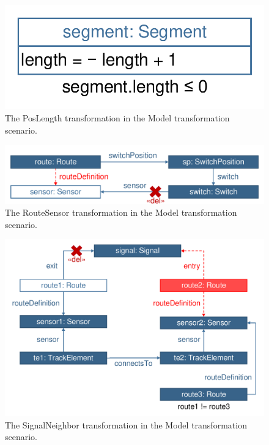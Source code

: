 \begin{figure}[!Htb]
	\centering
	\includegraphics[scale=0.4]{figures/trainbenchmark-transformation-xform-poslength}
	\caption{The \textsf{PosLength} transformation in the Model transformation scenario.}
	\label{fig:trainbenchmark-transformation-xform-poslength}
\end{figure}

\begin{figure}[!Htb]
	\centering
	\includegraphics[scale=0.4]{figures/trainbenchmark-transformation-xform-routesensor}
	\caption{The \textsf{RouteSensor} transformation in the Model transformation scenario.}
	\label{fig:trainbenchmark-transformation-xform-routesensor}
\end{figure}

\begin{figure}[!Htb]
	\centering
	\includegraphics[scale=0.4]{figures/trainbenchmark-transformation-xform-signalneighbor}
	\caption{The \textsf{SignalNeighbor} transformation in the Model transformation scenario.}
	\label{fig:trainbenchmark-transformation-xform-signalneighbor}
\end{figure}

